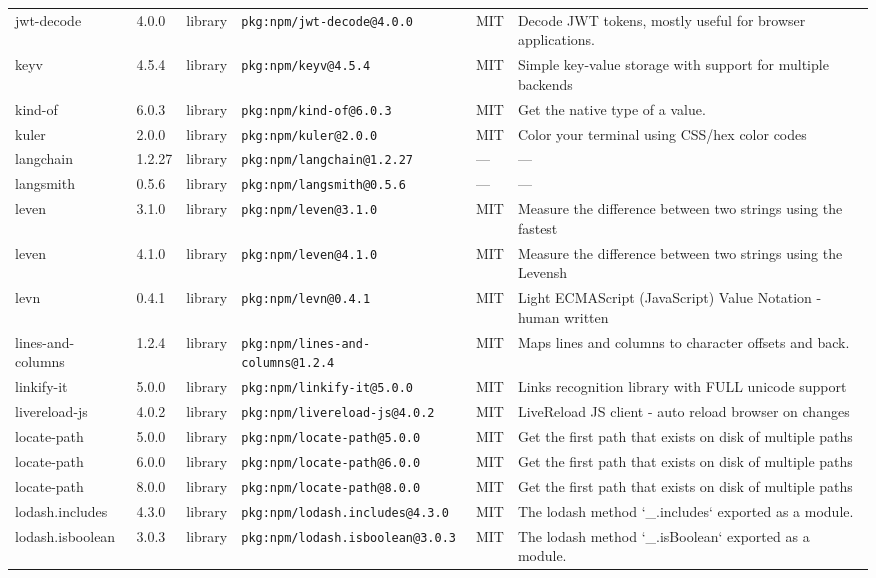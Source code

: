 \documentclass[11pt]{article}
\begin{document}
\begin{longtable}{|l|l|l|p{2.2cm}|l|p{4cm}|}
jwt-decode & 4.0.0 & library & \texttt{pkg:npm/jwt-decode@4.0.0} & MIT & Decode JWT tokens, mostly useful for browser applications. \\
keyv & 4.5.4 & library & \texttt{pkg:npm/keyv@4.5.4} & MIT & Simple key-value storage with support for multiple backends \\
kind-of & 6.0.3 & library & \texttt{pkg:npm/kind-of@6.0.3} & MIT & Get the native type of a value. \\
kuler & 2.0.0 & library & \texttt{pkg:npm/kuler@2.0.0} & MIT & Color your terminal using CSS/hex color codes \\
langchain & 1.2.27 & library & \texttt{pkg:npm/langchain@1.2.27} & — & — \\
langsmith & 0.5.6 & library & \texttt{pkg:npm/langsmith@0.5.6} & — & — \\
leven & 3.1.0 & library & \texttt{pkg:npm/leven@3.1.0} & MIT & Measure the difference between two strings using the fastest \\
leven & 4.1.0 & library & \texttt{pkg:npm/leven@4.1.0} & MIT & Measure the difference between two strings using the Levensh \\
levn & 0.4.1 & library & \texttt{pkg:npm/levn@0.4.1} & MIT & Light ECMAScript (JavaScript) Value Notation - human written \\
lines-and-columns & 1.2.4 & library & \texttt{pkg:npm/lines-and-columns@1.2.4} & MIT & Maps lines and columns to character offsets and back. \\
linkify-it & 5.0.0 & library & \texttt{pkg:npm/linkify-it@5.0.0} & MIT & Links recognition library with FULL unicode support \\
livereload-js & 4.0.2 & library & \texttt{pkg:npm/livereload-js@4.0.2} & MIT & LiveReload JS client - auto reload browser on changes \\
locate-path & 5.0.0 & library & \texttt{pkg:npm/locate-path@5.0.0} & MIT & Get the first path that exists on disk of multiple paths \\
locate-path & 6.0.0 & library & \texttt{pkg:npm/locate-path@6.0.0} & MIT & Get the first path that exists on disk of multiple paths \\
locate-path & 8.0.0 & library & \texttt{pkg:npm/locate-path@8.0.0} & MIT & Get the first path that exists on disk of multiple paths \\
lodash.includes & 4.3.0 & library & \texttt{pkg:npm/lodash.includes@4.3.0} & MIT & The lodash method `\_.includes` exported as a module. \\
lodash.isboolean & 3.0.3 & library & \texttt{pkg:npm/lodash.isboolean@3.0.3} & MIT & The lodash method `\_.isBoolean` exported as a module. \\

\end{longtable}
\end{document}
